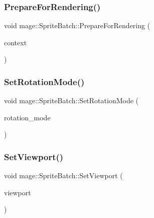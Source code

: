 \hypertarget{classmage_1_1_sprite_batch_a6c065e5b9520dbc25354ed3a87525956}{}\label{classmage_1_1_sprite_batch_a6c065e5b9520dbc25354ed3a87525956} 
\subsubsection{\texorpdfstring{Prepare\+For\+Rendering()}{PrepareForRendering()}}
{\footnotesize\ttfamily void mage\+::\+Sprite\+Batch\+::\+Prepare\+For\+Rendering (\begin{DoxyParamCaption}\item[{I\+D3\+D11\+Device\+Context \&}]{context }\end{DoxyParamCaption})\hspace{0.3cm}{\ttfamily [private]}}

\hypertarget{classmage_1_1_sprite_batch_a61ab7462374d9190220629be7827ba4b}{}\label{classmage_1_1_sprite_batch_a61ab7462374d9190220629be7827ba4b} 
\subsubsection{\texorpdfstring{Set\+Rotation\+Mode()}{SetRotationMode()}}
{\footnotesize\ttfamily void mage\+::\+Sprite\+Batch\+::\+Set\+Rotation\+Mode (\begin{DoxyParamCaption}\item[{D\+X\+G\+I\+\_\+\+M\+O\+D\+E\+\_\+\+R\+O\+T\+A\+T\+I\+ON}]{rotation\+\_\+mode }\end{DoxyParamCaption})}

\hypertarget{classmage_1_1_sprite_batch_aab9eab10e3ea1c62b483a67a47d9ccdc}{}\label{classmage_1_1_sprite_batch_aab9eab10e3ea1c62b483a67a47d9ccdc} 
\subsubsection{\texorpdfstring{Set\+Viewport()}{SetViewport()}}
{\footnotesize\ttfamily void mage\+::\+Sprite\+Batch\+::\+Set\+Viewport (\begin{DoxyParamCaption}\item[{const D3\+D11\+\_\+\+V\+I\+E\+W\+P\+O\+RT \&}]{viewport }\end{DoxyParamCaption})}



